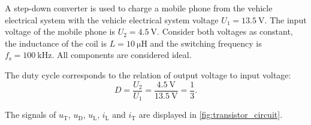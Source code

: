 
A step-down converter is used to charge a mobile phone from the vehicle electrical system with the vehicle electrical system voltage $U_1 = \SI{13.5}{\volt}$. The input voltage of the mobile phone is $U_2 = \SI{4.5}{\volt}$. Consider both voltages as constant, the inductance of the coil is $L = \SI{10}{\micro\henry}$ and the switching frequency is $f_\mathrm{s} = \SI{ 100}{\kilo\hertz}$. All components are considered ideal.






\begin{solutionblock}



\end{solutionblock}

\begin{solutionblock}
    The duty cycle corresponds to the relation of output voltage to input voltage:
    \begin{equation}
        D = \frac{U_2}{U_1} = \frac{\SI{ 4.5}{\volt}}{\SI{ 13.5}{\volt}} = \frac{1}{3}.
    \end{equation}
\end{solutionblock}
   
\begin{solutionblock} %
The signals of $u_\mathrm{T}$, $u_\mathrm{D}$, $u_\mathrm{L}$, $i_\mathrm{L}$ and $i_\mathrm{T}$ are displayed in \autoref{fig:transistor_circuit}.



\end{solutionblock}

